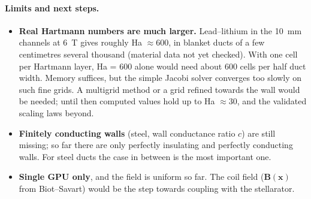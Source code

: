 \paragraph{Limits and next steps.}
\begin{itemize}\itemsep1pt
\item \textbf{Real Hartmann numbers are much larger.} Lead--lithium in the \SI{10}{mm} channels at \SI{6}{T} gives
  roughly Ha $\approx 600$, in blanket ducts of a few centimetres several thousand (material data not yet checked).
  With one cell per Hartmann layer, Ha = 600 alone would need about 600 cells per half duct width. Memory suffices,
  but the simple Jacobi solver converges too slowly on such fine grids. A multigrid method or a grid refined towards
  the wall would be needed; until then computed values hold up to Ha $\approx 30$, and the validated scaling laws
  beyond.
\item \textbf{Finitely conducting walls} (steel, wall conductance ratio $c$) are still missing; so far there are only
  perfectly insulating and perfectly conducting walls. For steel ducts the case in between is the most important one.
\item \textbf{Single GPU only}, and the field is uniform so far. The coil field ($\mathbf{B}(\mathbf{x})$ from
  Biot--Savart) would be the step towards coupling with the stellarator.
\end{itemize}
